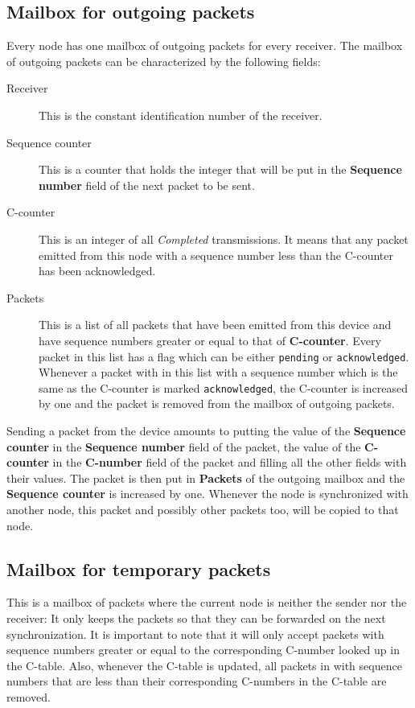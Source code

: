 \documentclass{article}
\begin{document}
\subsection{Mailbox for outgoing packets}
Every node has one mailbox of outgoing packets for every receiver. The mailbox of outgoing packets can be characterized by the following fields:
\begin{description}
  \item[Receiver] This is the constant identification number of the receiver.
  \item[Sequence counter] This is a counter that holds the integer that will be put in the \textbf{Sequence number} field of the next packet to be sent.
  \item[C-counter] This is an integer of all \emph{Completed} transmissions. It means that any packet emitted from this node with a sequence number less than the C-counter has been acknowledged.
  \item[Packets] This is a list of all packets that have been emitted from this device and have sequence numbers greater or equal to that of \textbf{C-counter}. Every packet in this list has a flag which can be either \texttt{pending} or \texttt{acknowledged}. Whenever a packet with in this list with a sequence number which is the same as the C-counter is marked \texttt{acknowledged}, the C-counter is increased by one and the packet is removed from the mailbox of outgoing packets.
\end{description}

Sending a packet from the device amounts to putting the value of the \textbf{Sequence counter} in the \textbf{Sequence number} field of the packet, the value of the \textbf{C-counter} in the \textbf{C-number} field of the packet and filling all the other fields with their values. The packet is then put in \textbf{Packets} of the outgoing mailbox and the \textbf{Sequence counter} is increased by one. Whenever the node is synchronized with another node, this packet and possibly other packets too, will be copied to that node.

\subsection{Mailbox for temporary packets}
This is a mailbox of packets where the current node is neither the sender nor the receiver: It only keeps the packets so that they can be forwarded on the next synchronization. It is important to note that it will only accept packets with sequence numbers greater or equal to the corresponding C-number looked up in the C-table. Also, whenever the C-table is updated, all packets in with sequence numbers that are less than their corresponding C-numbers in the C-table are removed.
\end{document}
